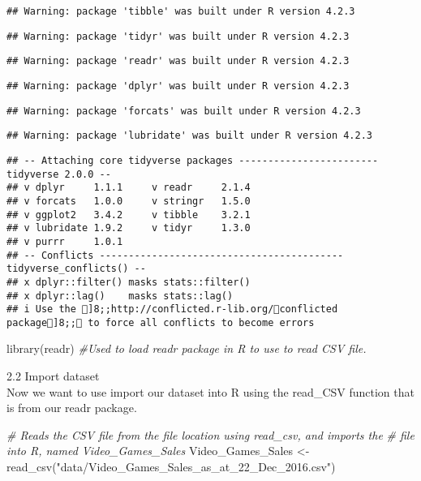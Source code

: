 \documentclass[
]{article}
\newenvironment{Shaded}{\begin{snugshade}}{\end{snugshade}}
\newcommand{\CommentTok}[1]{\textcolor[rgb]{0.56,0.35,0.01}{\textit{#1}}}
\newcommand{\FunctionTok}[1]{\textcolor[rgb]{0.00,0.00,0.00}{#1}}
\newcommand{\NormalTok}[1]{#1}
\newcommand{\OtherTok}[1]{\textcolor[rgb]{0.56,0.35,0.01}{#1}}
\newcommand{\StringTok}[1]{\textcolor[rgb]{0.31,0.60,0.02}{#1}}
\begin{document}
\begin{verbatim}
## Warning: package 'tibble' was built under R version 4.2.3
\end{verbatim}

\begin{verbatim}
## Warning: package 'tidyr' was built under R version 4.2.3
\end{verbatim}

\begin{verbatim}
## Warning: package 'readr' was built under R version 4.2.3
\end{verbatim}

\begin{verbatim}
## Warning: package 'dplyr' was built under R version 4.2.3
\end{verbatim}

\begin{verbatim}
## Warning: package 'forcats' was built under R version 4.2.3
\end{verbatim}

\begin{verbatim}
## Warning: package 'lubridate' was built under R version 4.2.3
\end{verbatim}

\begin{verbatim}
## -- Attaching core tidyverse packages ------------------------ tidyverse 2.0.0 --
## v dplyr     1.1.1     v readr     2.1.4
## v forcats   1.0.0     v stringr   1.5.0
## v ggplot2   3.4.2     v tibble    3.2.1
## v lubridate 1.9.2     v tidyr     1.3.0
## v purrr     1.0.1     
## -- Conflicts ------------------------------------------ tidyverse_conflicts() --
## x dplyr::filter() masks stats::filter()
## x dplyr::lag()    masks stats::lag()
## i Use the ]8;;http://conflicted.r-lib.org/conflicted package]8;; to force all conflicts to become errors
\end{verbatim}

\begin{Shaded}
\begin{Highlighting}[]
\FunctionTok{library}\NormalTok{(readr)  }\CommentTok{\#Used to load readr package in R to use to read CSV file.}
\end{Highlighting}
\end{Shaded}

2.2 Import dataset\\
Now we want to use import our dataset into R using the read\_CSV
function that is from our readr package.

\begin{Shaded}
\begin{Highlighting}[]
\CommentTok{\# Reads the CSV file from the file location using read\_csv, and imports the}
\CommentTok{\# file into R, named Video\_Games\_Sales}
\NormalTok{Video\_Games\_Sales }\OtherTok{\textless{}{-}} \FunctionTok{read\_csv}\NormalTok{(}\StringTok{"data/Video\_Games\_Sales\_as\_at\_22\_Dec\_2016.csv"}\NormalTok{)}
\end{Highlighting}
\end{Shaded}
\end{document}
